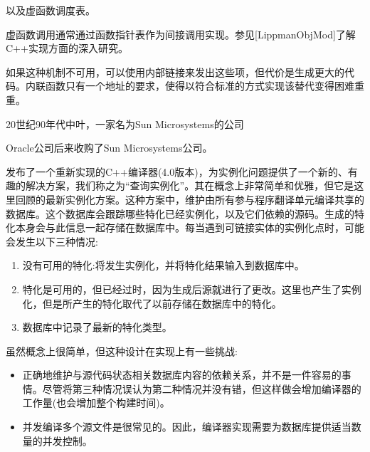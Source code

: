 以及虚函数调度表。

\begin{tcolorbox}[colback=webgreen!5!white,colframe=webgreen!75!black]
\hspace*{0.75cm}虚函数调用通常通过函数指针表作为间接调用实现。参见[LippmanObjMod]了解C++实现方面的深入研究。
\end{tcolorbox}

如果这种机制不可用，可以使用内部链接来发出这些项，但代价是生成更大的代码。内联函数只有一个地址的要求，使得以符合标准的方式实现该替代变得困难重重。


20世纪90年代中叶，一家名为Sun Microsystems的公司

\begin{tcolorbox}[colback=webgreen!5!white,colframe=webgreen!75!black]
\hspace*{0.75cm}Oracle公司后来收购了Sun Microsystems公司。
\end{tcolorbox}

发布了一个重新实现的C++编译器(4.0版本)，为实例化问题提供了一个新的、有趣的解决方案，我们称之为“查询实例化”。其在概念上非常简单和优雅，但它是这里回顾的最新实例化方案。这种方案中，维护由所有参与程序翻译单元编译共享的数据库。这个数据库会跟踪哪些特化已经实例化，以及它们依赖的源码。生成的特化本身会与此信息一起存储在数据库中。每当遇到可链接实体的实例化点时，可能会发生以下三种情况:

\begin{enumerate}
\item 
没有可用的特化:将发生实例化，并将特化结果输入到数据库中。

\item 
特化是可用的，但已经过时，因为生成后源就进行了更改。这里也产生了实例化，但是所产生的特化取代了以前存储在数据库中的特化。

\item 
数据库中记录了最新的特化类型。
\end{enumerate}

虽然概念上很简单，但这种设计在实现上有一些挑战:

\begin{itemize}
\item 
正确地维护与源代码状态相关数据库内容的依赖关系，并不是一件容易的事情。尽管将第三种情况误认为第二种情况并没有错，但这样做会增加编译器的工作量(也会增加整个构建时间)。

\item 
并发编译多个源文件是很常见的。因此，编译器实现需要为数据库提供适当数量的并发控制。
\end{itemize}

